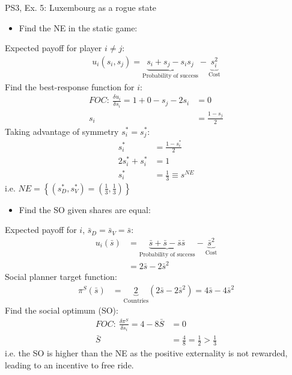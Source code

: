 \begin{frame}{PS3, Ex. 5: Luxembourg as a rogue state}
  \begin{multicols}{2}
    \begin{itemize}
      \item[(a)] Find the NE in the static game:
    \end{itemize}
    Expected payoff for player $i\neq j$:
    \begin{align*}
      u_i(s_i,s_j)=\underbrace{s_i+s_j-s_is_j}_\text{Probability of success}-\underbrace{s_i^2}_\text{Cost}
    \end{align*}
    Find the best-response function for $i$:
    \begin{align*}
      FOC:\ \frac{\delta u_i}{\delta s_i}=1+0-s_j-2s_i&=0\\
       s_i&=\frac{1-s_j}{2}
    \end{align*}
    Taking advantage of symmetry $s_i^{*}=s_j^{*}$:
    \begin{align*}
       s_i^{*}&=\frac{1-s_i^{*}}{2}\\
      2s_i^{*}+s_i^{*}&=1\\
       s_i^{*}&=\frac{1}{3}\equiv s^{NE}
    \end{align*}
    i.e. $NE=\left\{(s_D^{*},s_V^{*})=(\frac{1}{3},\frac{1}{3})\right\}$
  \vfill\null\columnbreak
    \begin{itemize}
      \item[(b)] Find the SO given shares are equal:
    \end{itemize}
    Expected payoff for $i$, $\bar{s}_D=\bar{s}_V=\bar{s}$:
    \begin{align*}
      u_i(\bar{s})&=\underbrace{\bar{s}+\bar{s}-\bar{s}\bar{s}}_\text{Probability of success}-\underbrace{\bar{s}^2}_\text{Cost}\\
                  &=2\bar{s}-2\bar{s}^2
    \end{align*}
    Social planner target function:
    \begin{align*}
      \pi^S(\bar{s})&=\underbrace{2}_\text{Countries}(2\bar{s}-2\bar{s}^2)=4\bar{s}-4\bar{s}^2
    \end{align*}
    Find the social optimum (SO):
    \begin{align*}
      FOC:\ \frac{\delta\pi^S}{\delta s_i}=4-8\bar{S}&=0\\
       \bar{S}&=\frac{4}{8}=\frac{1}{2}>\frac{1}{3}
    \end{align*}
    i.e. the SO is higher than the NE as the positive externality is not rewarded, leading to an incentive to free ride.
  \vfill\null
  \end{multicols}
\end{frame}


